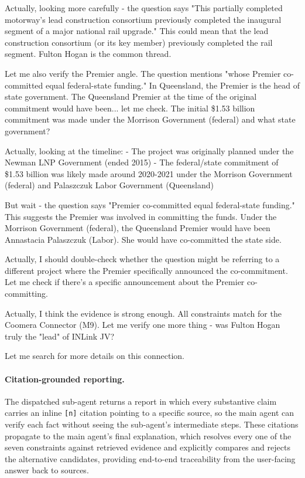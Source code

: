 \documentclass[table]{gtech}
\begin{document}
\begin{tcolorbox}
Actually, looking more carefully - the question says "This partially completed motorway's lead construction consortium previously completed the inaugural segment of a major national rail upgrade." This could mean that the lead construction consortium (or its key member) previously completed the rail segment. Fulton Hogan is the common thread.

Let me also verify the Premier angle. The question mentions "whose Premier co-committed equal federal-state funding." In Queensland, the Premier is the head of state government. The Queensland Premier at the time of the original commitment would have been... let me check. The initial \$1.53 billion commitment was made under the Morrison Government (federal) and what state government? 

Actually, looking at the timeline:
- The project was originally planned under the Newman LNP Government (ended 2015)
- The federal/state commitment of \$1.53 billion was likely made around 2020-2021 under the Morrison Government (federal) and Palaszczuk Labor Government (Queensland)

But wait - the question says "Premier co-committed equal federal-state funding." This suggests the Premier was involved in committing the funds. Under the Morrison Government (federal), the Queensland Premier would have been Annastacia Palaszczuk (Labor). She would have co-committed the state side.

Actually, I should double-check whether the question might be referring to a different project where the Premier specifically announced the co-commitment. Let me check if there's a specific announcement about the Premier co-committing.

Actually, I think the evidence is strong enough. All constraints match for the Coomera Connector (M9). Let me verify one more thing - was Fulton Hogan truly the "lead" of INLink JV?

Let me search for more details on this connection.
\end{tcolorbox}

\paragraph{Citation-grounded reporting.} The dispatched sub-agent returns a report in which every substantive claim carries an inline \texttt{[n]} citation pointing to a specific source, so the main agent can verify each fact without seeing the sub-agent's intermediate steps. These citations propagate to the main agent's final explanation, which resolves every one of the seven constraints against retrieved evidence and explicitly compares and rejects the alternative candidates, providing end-to-end traceability from the user-facing answer back to sources.
\end{document}
